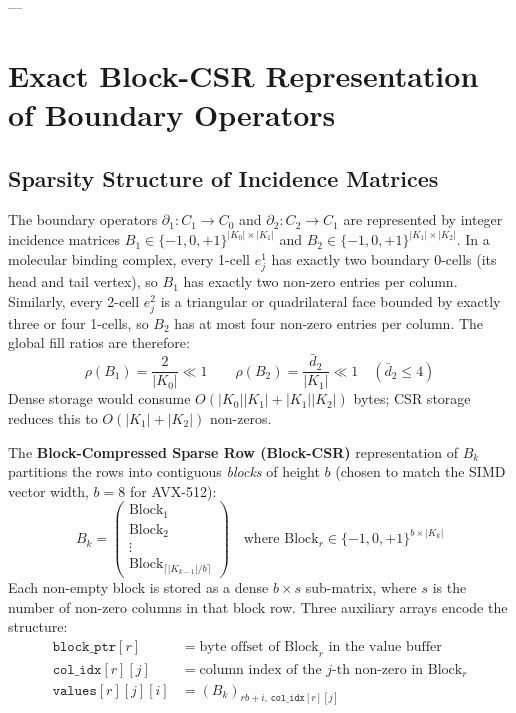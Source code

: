 ---

\section{Exact Block-CSR Representation of Boundary Operators}
\label{sec:blockcsr}

\subsection{Sparsity Structure of Incidence Matrices}
\label{subsec:sparsity}

The boundary operators $\partial_1 : C_1 \to C_0$ and
$\partial_2 : C_2 \to C_1$ are represented by integer incidence matrices
$B_1 \in \{-1,0,+1\}^{|K_0|\times|K_1|}$ and
$B_2 \in \{-1,0,+1\}^{|K_1|\times|K_2|}$.  In a molecular binding
complex, every 1-cell $e_j^1$ has exactly two boundary 0-cells (its
head and tail vertex), so $B_1$ has exactly two non-zero entries per
column.  Similarly, every 2-cell $e_j^2$ is a triangular or quadrilateral
face bounded by exactly three or four 1-cells, so $B_2$ has at most four
non-zero entries per column.  The global fill ratios are therefore:
\begin{equation}
    \rho(B_1) = \frac{2}{|K_0|} \ll 1
    \qquad
    \rho(B_2) = \frac{\bar{d}_2}{|K_1|} \ll 1
    \quad (\bar{d}_2 \le 4)
\end{equation}
Dense storage would consume $O(|K_0||K_1| + |K_1||K_2|)$ bytes; CSR
storage reduces this to $O(|K_1| + |K_2|)$ non-zeros.

\begin{definition}
\label{def:block_csr}
The \textbf{Block-Compressed Sparse Row (Block-CSR)} representation of
$B_k$ partitions the rows into contiguous \emph{blocks} of height
$b$ (chosen to match the SIMD vector width, $b = 8$ for AVX-512):
\begin{equation}
    B_k = \begin{pmatrix} \text{Block}_1 \\ \text{Block}_2 \\ \vdots \\ \text{Block}_{\lceil|K_{k-1}|/b\rceil} \end{pmatrix}
    \quad \text{where } \text{Block}_r \in \{-1,0,+1\}^{b \times |K_k|}
\end{equation}
Each non-empty block is stored as a dense $b \times s$ sub-matrix, where
$s$ is the number of non-zero columns in that block row.  Three auxiliary
arrays encode the structure:
\begin{align*}
    \texttt{block\_ptr}[r]   &= \text{byte offset of Block}_r\text{ in the value buffer} \\
    \texttt{col\_idx}[r][j]  &= \text{column index of the } j\text{-th non-zero in Block}_r \\
    \texttt{values}[r][j][i] &= (B_k)_{rb+i,\,\texttt{col\_idx}[r][j]}
\end{align*}
\end{definition}

